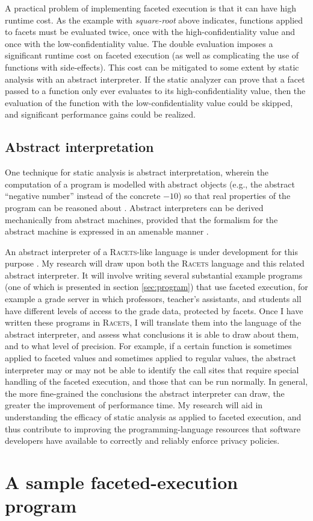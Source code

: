 \documentclass{article}
\begin{document}
A practical problem of implementing faceted execution is that it can have high runtime cost. As the example with \textit{square-root} above indicates, functions applied to facets must be evaluated twice, once with the high-confidentiality value and once with the low-confidentiality value. The double evaluation imposes a significant runtime cost on faceted execution (as well as complicating the use of functions with side-effects). This cost can be mitigated to some extent by static analysis with an abstract interpreter. If the static analyzer can prove that a facet passed to a function only ever evaluates to its high-confidentiality value, then the evaluation of the function with the low-confidentiality value could be skipped, and significant performance gains could be realized.

\subsection{Abstract interpretation}
One technique for static analysis is abstract interpretation, wherein the computation of a program is modelled with abstract objects (e.g., the abstract ``negative number'' instead of the concrete $-10$) so that real properties of the program can be reasoned about \cite{ai-original}. Abstract interpreters can be derived mechanically from abstract machines, provided that the formalism for the abstract machine is expressed in an amenable manner \cite{aam}.

An abstract interpreter of a \textsc{Racets}-like language is under development for this purpose \cite{abstract-inter}. My research will draw upon both the \textsc{Racets} language and this related abstract interpreter. It will involve writing several substantial example programs (one of which is presented in section \ref{sec:program}) that use faceted execution, for example a grade server in which professors, teacher's assistants, and students all have different levels of access to the grade data, protected by facets. Once I have written these programs in \textsc{Racets}, I will translate them into the language of the abstract interpreter, and assess what conclusions it is able to draw about them, and to what level of precision. For example, if a certain function is sometimes applied to faceted values and sometimes applied to regular values, the abstract interpreter may or may not be able to identify the call sites that require special handling of the faceted execution, and those that can be run normally. In general, the more fine-grained the conclusions the abstract interpreter can draw, the greater the improvement of performance time. My research will aid in understanding the efficacy of static analysis as applied to faceted execution, and thus contribute to improving the programming-language resources that software developers have available to correctly and reliably enforce privacy policies.

\section{A sample faceted-execution program\label{sec:program}}


\end{document}
